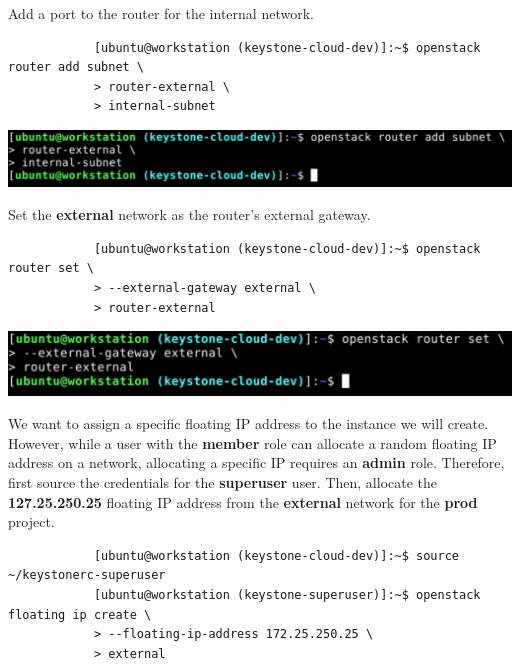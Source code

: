 \documentclass[letterpaper, 12pt]{article}
\begin{document}
\begin{enumerate}
    \begin{labstep}
        Add a port to the router for the internal network.
        \begin{lstlisting}
            [ubuntu@workstation (keystone-cloud-dev)]:~$ openstack router add subnet \
            > router-external \
            > internal-subnet
        \end{lstlisting}

        \begin{center}
            \includegraphics[width=\linewidth]{images/part1/step29.png}
        \end{center}
    \end{labstep}

    \begin{labstep}
        Set the \textbf{external} network as the router's external gateway.
        \begin{lstlisting}
            [ubuntu@workstation (keystone-cloud-dev)]:~$ openstack router set \
            > --external-gateway external \
            > router-external
        \end{lstlisting}

        \begin{center}
            \includegraphics[width=\linewidth]{images/part1/step30.png}
        \end{center}
    \end{labstep}

    \begin{labstep}
        We want to assign a specific floating IP address to the instance we will create.
        However, while a user with the \textbf{member} role can allocate a random floating IP address on a network, allocating a specific IP requires an \textbf{admin} role.
        Therefore, first source the credentials for the \textbf{superuser} user.
        Then, allocate the \textbf{127.25.250.25} floating IP address from the \textbf{external} network for the \textbf{prod} project.
        \begin{lstlisting}
            [ubuntu@workstation (keystone-cloud-dev)]:~$ source ~/keystonerc-superuser
            [ubuntu@workstation (keystone-superuser)]:~$ openstack floating ip create \
            > --floating-ip-address 172.25.250.25 \
            > external
        \end{lstlisting}


\end{labstep}
\end{enumerate}
\end{document}
